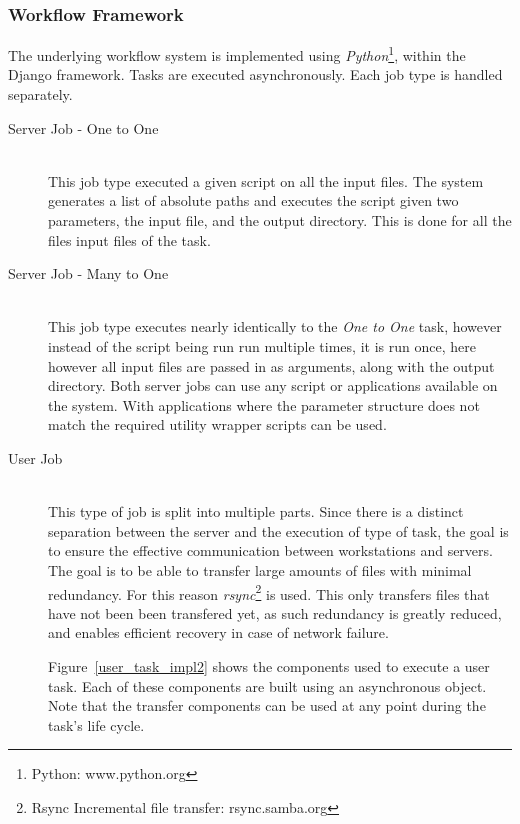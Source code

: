 \documentclass[12pt,a4paper]{report}
\begin{document}
\subsubsection{Workflow Framework}
The underlying workflow system is implemented using \emph{Python}\footnote{Python: www.python.org}, within
the Django framework. Tasks are executed asynchronously. Each job type is handled separately.
\begin{description}
\item[Server Job - One to One] \hfill \\
    This job type executed a given script on all the input files. The system generates a list of
    absolute paths and executes the script given two parameters, the input file, and the output
    directory. This is done for all the files input files of the task.
\item[Server Job - Many to One] \hfill \\
    This job type executes nearly identically to the \emph{One to One} task, however instead
    of the script being run run multiple times, it is run once, here however all input files
    are passed in as arguments, along with the output directory. Both server jobs can use
    any script or applications available on the system. With applications where the parameter
    structure does not match the required utility wrapper scripts can be used.
\item[User Job] \hfill \\
    This type of job is split into multiple parts. Since there is a distinct separation between
    the server and the execution of type of task, the goal is to ensure the effective communication
    between workstations and servers. The goal is to be able to transfer large amounts of files
    with minimal redundancy. For this reason \emph{rsync}\footnote{Rsync Incremental file
    transfer: rsync.samba.org} is used. This only transfers files that have not been been transfered
    yet, as such redundancy is greatly reduced, and enables efficient recovery in case of network failure.

    Figure~\ref{user_task_impl2} shows the components used to execute a user task. Each of these components
    are built using an asynchronous object. Note that the transfer components can be used at any point
    during the task's life cycle.
\end{description}
\end{document}

